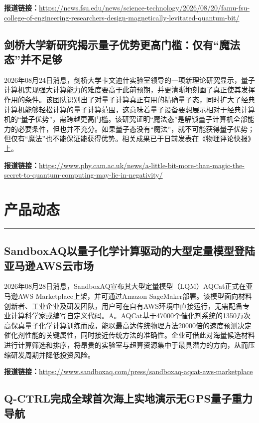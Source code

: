 \documentclass[12pt,a4paper]{ctexart}
\begin{document}
\noindent\textbf{报道链接：}\url{https://news.fsu.edu/news/science-technology/2026/08/20/famu-fsu-college-of-engineering-researchers-design-magnetically-levitated-quantum-bit/}

\subsection{ 剑桥大学新研究揭示量子优势更高门槛：仅有“魔法态”并不足够 }

2026年08月24日消息，剑桥大学卡文迪什实验室领导的一项新理论研究显示，量子计算机实现强大计算能力的难度要高于此前预期，并更清晰地刻画了真正使其发挥作用的条件。该团队识别出了对量子计算真正有用的精确量子态，同时扩大了经典计算机能够轻松计算的量子计算范围，这意味着量子设备要想展示相对于经典计算机的“量子优势”，需跨越更高门槛。该研究证明“魔法态”是解锁量子计算机全部能力的必要条件，但也并不充分。如果量子态没有“魔法”，就不可能获得量子优势；但仅有“魔法”也不能保证能获得优势。相关成果已于日前发表在《物理评论快报》上。

\noindent\textbf{报道链接：}\url{https://www.phy.cam.ac.uk/news/a-little-bit-more-than-magic-the-secret-to-quantum-computing-may-lie-in-negativity/}


\newpage
\section{产品动态}
\vspace{-0.5em}
\noindent\rule{\linewidth}{1.5pt}

\subsection{ SandboxAQ以量子化学计算驱动的大型定量模型登陆亚马逊AWS云市场 }

2026年08月28日消息，SandboxAQ宣布其大型定量模型（LQM）AQCat正式在亚马逊AWS Marketplace上架，并可通过Amazon SageMaker部署。该模型面向材料创新者、工业企业及研发团队，用户可在自有AWS环境中直接运行，无需配备专业计算科学家或编写自定义代码。A。AQCat基于47000个催化剂系统的1350万次高保真量子化学计算训练而成，能以最高达传统物理方法20000倍的速度预测决定催化剂性能的关键属性，同时接近传统方法的准确性。企业可借此对海量候选材料进行计算筛选和排序，将昂贵的实验室与超算资源集中于最具潜力的方向，从而压缩研发周期并降低投资风险。

\noindent\textbf{报道链接：}\url{https://www.sandboxaq.com/press/sandboxaq-aqcat-aws-marketplace}

\subsection{ Q-CTRL完成全球首次海上实地演示无GPS量子重力导航 }
\end{document}
